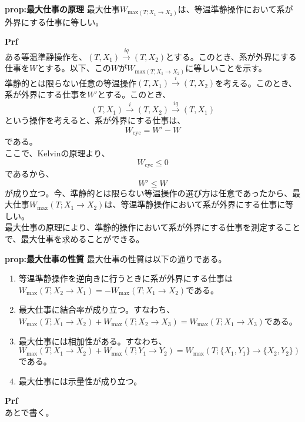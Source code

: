 \documentclass[a4paper,11pt]{jsarticle}
\begin{document}
\begin{itembox}[l]{\textbf{prop:最大仕事の原理}}
    最大仕事$W_{\text{max}(T;X_1\rightarrow X_2)}$は、等温準静操作において系が外界にする仕事に等しい。
\end{itembox}
\textbf{Prf}\\
ある等温準静操作を、$(T,X_1) \xrightarrow{iq} (T,X_2)$とする。このとき、系が外界にする仕事を$W$とする。以下、この$W$が$W_{\text{max}(T;X_1\rightarrow X_2)}$に等しいことを示す。\\
準静的とは限らない任意の等温操作$(T,X_1) \xrightarrow{i} (T,X_2)$を考える。このとき、系が外界にする仕事を$W'$とする。このとき、
\begin{equation}
    (T,X_1) \xrightarrow{i} (T,X_2) \xrightarrow{iq} (T,X_1)
\end{equation}
という操作を考えると、系が外界にする仕事は、
\begin{equation}
    W_{\text{cyc}} = W'-W
\end{equation}
である。\\
ここで、Kelvinの原理より、
\begin{equation}
    W_{\text{cyc}} \leq 0
\end{equation}
であるから、
\begin{equation}
    W' \leq W
\end{equation}
が成り立つ。今、準静的とは限らない等温操作の選び方は任意であったから、最大仕事$W_{\text{max}}(T;X_1\rightarrow X_2)$は、等温準静操作において系が外界にする仕事に等しい。\\

最大仕事の原理により、準静的操作において系が外界にする仕事を測定することで、最大仕事を求めることができる。\\

\begin{itembox}[l]{\textbf{prop:最大仕事の性質}}
    最大仕事の性質は以下の通りである。
    \begin{enumerate}
        \item 等温準静操作を逆向きに行うときに系が外界にする仕事は$W_{\text{max}}(T;X_2\rightarrow X_1)=-W_{\text{max}}(T;X_1\rightarrow X_2)$である。
        \item 最大仕事に結合率が成り立つ。すなわち、$W_{\text{max}}(T;X_1\rightarrow X_2)+W_{\text{max}}(T;X_2\rightarrow X_3) = W_{\text{max}}(T;X_1\rightarrow X_3)$である。
        \item 最大仕事には相加性がある。すなわち、$W_{\text{max}}(T;X_1\rightarrow X_2)+W_{\text{max}}(T;Y_1\rightarrow Y_2) = W_{\text{max}}(T;\{X_1,Y_1\}\rightarrow \{X_2,Y_2\})$である。
        \item 最大仕事には示量性が成り立つ。
    \end{enumerate}
\end{itembox}
\textbf{Prf}\\
あとで書く。\\
\end{document}
